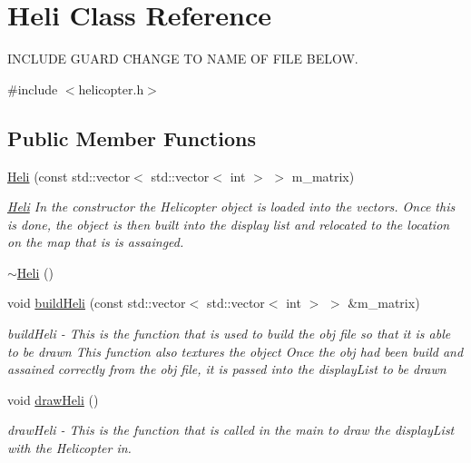 \hypertarget{classHeli}{
\section{Heli Class Reference}
\label{classHeli}
}


INCLUDE GUARD CHANGE TO NAME OF FILE BELOW.  


{\ttfamily \#include $<$helicopter.h$>$}\subsection*{Public Member Functions}
\begin{DoxyCompactItemize}
\item 
\hyperlink{classHeli_afdc33af64542d4e838d90f3b5d87fb5a}{Heli} (const std::vector$<$ std::vector$<$ int $>$ $>$ m\_\-matrix)
\begin{DoxyCompactList}\small\item\em \hyperlink{classHeli}{Heli} In the constructor the Helicopter object is loaded into the vectors. Once this is done, the object is then built into the display list and relocated to the location on the map that is is assainged. \item\end{DoxyCompactList}\item 
\hyperlink{classHeli_a935c117e63b10879606e1cb6bf58da83}{$\sim$Heli} ()
\item 
void \hyperlink{classHeli_a2b4ba9ea5d9f95a75f04cf4ce111f581}{buildHeli} (const std::vector$<$ std::vector$<$ int $>$ $>$ \&m\_\-matrix)
\begin{DoxyCompactList}\small\item\em buildHeli -\/ This is the function that is used to build the obj file so that it is able to be drawn This function also textures the object Once the obj had been build and assained correctly from the obj file, it is passed into the displayList to be drawn \item\end{DoxyCompactList}\item 
\hypertarget{classHeli_aae829b9ee18ac6564b43abd186c7c7a4}{
void \hyperlink{classHeli_aae829b9ee18ac6564b43abd186c7c7a4}{drawHeli} ()}
\label{classHeli_aae829b9ee18ac6564b43abd186c7c7a4}

\begin{DoxyCompactList}\small\item\em drawHeli -\/ This is the function that is called in the main to draw the displayList with the Helicopter in. \item\end{DoxyCompactList}\end{DoxyCompactItemize}
